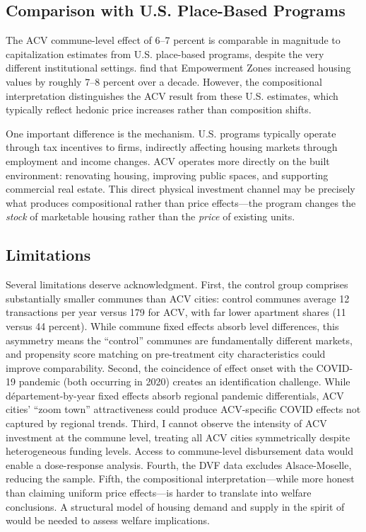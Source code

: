 \documentclass[12pt]{article}
\begin{document}
\subsection{Comparison with U.S. Place-Based Programs}

The ACV commune-level effect of 6--7 percent is comparable in magnitude to capitalization estimates from U.S. place-based programs, despite the very different institutional settings. \citet{busso2013assessing} find that Empowerment Zones increased housing values by roughly 7--8 percent over a decade. However, the compositional interpretation distinguishes the ACV result from these U.S. estimates, which typically reflect hedonic price increases rather than composition shifts.

One important difference is the mechanism. U.S. programs typically operate through tax incentives to firms, indirectly affecting housing markets through employment and income changes. ACV operates more directly on the built environment: renovating housing, improving public spaces, and supporting commercial real estate. This direct physical investment channel may be precisely what produces compositional rather than price effects---the program changes the \textit{stock} of marketable housing rather than the \textit{price} of existing units.

\subsection{Limitations}

Several limitations deserve acknowledgment. First, the control group comprises substantially smaller communes than ACV cities: control communes average 12 transactions per year versus 179 for ACV, with far lower apartment shares (11 versus 44 percent). While commune fixed effects absorb level differences, this asymmetry means the ``control'' communes are fundamentally different markets, and propensity score matching on pre-treatment city characteristics could improve comparability. Second, the coincidence of effect onset with the COVID-19 pandemic (both occurring in 2020) creates an identification challenge. While d\'{e}partement-by-year fixed effects absorb regional pandemic differentials, ACV cities' ``zoom town'' attractiveness could produce ACV-specific COVID effects not captured by regional trends. Third, I cannot observe the intensity of ACV investment at the commune level, treating all ACV cities symmetrically despite heterogeneous funding levels. Access to commune-level disbursement data would enable a dose-response analysis. Fourth, the DVF data excludes Alsace-Moselle, reducing the sample. Fifth, the compositional interpretation---while more honest than claiming uniform price effects---is harder to translate into welfare conclusions. A structural model of housing demand and supply in the spirit of \citet{ahlfeldt2015economics} would be needed to assess welfare implications.
\end{document}

